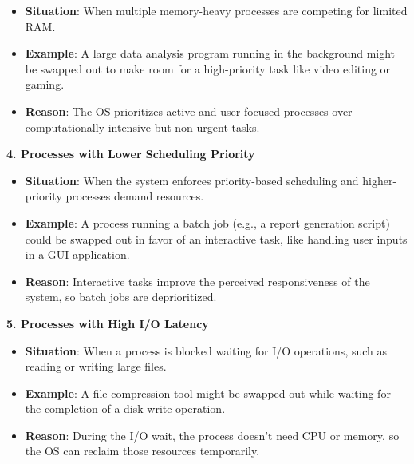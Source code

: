 \documentclass[a4paper]{book}
\begin{document}
\begin{itemize}
\item 
\textbf{Situation}: When multiple memory-heavy processes are competing for limited RAM.

\item 
\textbf{Example}: A large data analysis program running in the background might be swapped out to make room for a high-priority task like video editing or gaming.

\item 
\textbf{Reason}: The OS prioritizes active and user-focused processes over computationally intensive but non-urgent tasks.

\end{itemize}

\hrulefill

\textbf{4. Processes with Lower Scheduling Priority}

\begin{itemize}
\item 
\textbf{Situation}: When the system enforces priority-based scheduling and higher-priority processes demand resources.

\item 
\textbf{Example}: A process running a batch job (e.g., a report generation script) could be swapped out in favor of an interactive task, like handling user inputs in a GUI application.

\item 
\textbf{Reason}: Interactive tasks improve the perceived responsiveness of the system, so batch jobs are deprioritized.

\end{itemize}

\hrulefill

\textbf{5. Processes with High I/O Latency}

\begin{itemize}
\item 
\textbf{Situation}: When a process is blocked waiting for I/O operations, such as reading or writing large files.

\item 
\textbf{Example}: A file compression tool might be swapped out while waiting for the completion of a disk write operation.

\item 
\textbf{Reason}: During the I/O wait, the process doesn’t need CPU or memory, so the OS can reclaim those resources temporarily.

\end{itemize}
\end{document}
